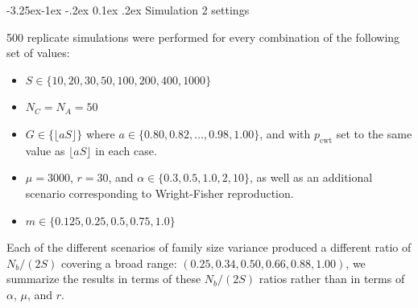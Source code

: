 \documentclass[11pt]{article}
\makeatletter
\renewcommand\subsection{\@startsection{subsection}{2}{\z@}%
                                     {-3.25ex\@plus -1ex \@minus -.2ex}%
                                     {0.1ex \@plus .2ex}%
                                     {\normalfont\normalsize\bfseries}}
\makeatother
\begin{document}
 
\subsection{Simulation 2 settings} 

500 replicate simulations were performed for every combination of the following set of values:
\begin{itemize}
\item $S \in \{10, 20, 30, 50, 100, 200, 400, 1000\}$
\item $N_C = N_A = 50$
\item $G \in \{\lfloor a S\rfloor\}$ where $a \in \{0.80, 0.82, \ldots, 0.98, 1.00\}$, and with $p_\mathrm{cwt}$ set to the same
value as $\lfloor a S\rfloor$ in each case.
\item $\mu = 3000$, $r = 30$, and $\alpha \in \{0.3, 0.5, 1.0, 2, 10\}$, as well as an additional scenario corresponding to
Wright-Fisher reproduction. 
\item $m \in \{0.125, 0.25, 0.5, 0.75, 1.0\}$
\end{itemize}


Each of the different scenarios of family size variance produced a different ratio of $N_b/(2S)$ covering a broad range:
$(0.25, 0.34, 0.50, 0.66, 0.88, 1.00)$, we summarize the results in terms of these $N_b/(2S)$ ratios
rather than in terms of $\alpha$, $\mu$, and $r$.



\end{document}
